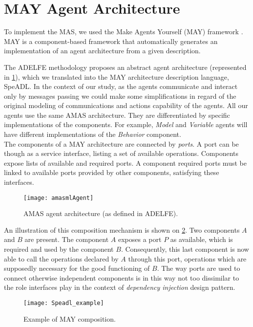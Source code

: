 \section{MAY Agent Architecture}

To implement the MAS, we used the Make Agents Yourself (MAY) framework \cite{No2012.2}. MAY is a component-based framework that automatically generates an implementation of an agent architecture from a given description.

The ADELFE methodology proposes an abstract agent architecture (represented in \figurename{} \ref{AMAS-ML_agent}), which we translated into the MAY architecture description language, SpeADL. In the context of our study, as the agents communicate and interact only by messages passing we could make some simplifications in regard of the original modeling of communications and actions capability of the agents. All our agents use the same AMAS architecture. They are differentiated by specific implementations of the components. For example, \emph{Model} and \emph{Variable} agents will have different implementations of the \emph{Behavior} component.\\
The components of a MAY architecture are connected by \emph{ports}. A port can be though as a service interface, listing a set of available operations. Components expose lists of available and required ports. A component required ports must be linked to available ports provided by other components, satisfying these interfaces.

\begin{figure}
\centering
\texttt{[image: amasmlAgent]}
\caption{AMAS agent architecture (as defined in ADELFE).}\label{AMAS-ML_agent}
\end{figure}

An illustration of this composition mechanism is shown on \figurename{} \ref{Speadl_example}. Two components $A$ and $B$ are present. The component $A$ exposes a port $P$ as available, which is required and used by the component $B$. Consequently, this last component is now able to call the operations declared by $A$ through this port, operations which are supposedly necessary for the good functioning of $B$. The way ports are used to connect otherwise independent components is in this way not too dissimilar to the role interfaces play in the context of \emph{dependency injection} design pattern.

\begin{figure}
\centering
\texttt{[image: Speadl\_example]}
\caption{Example of MAY composition.}\label{Speadl_example}
\end{figure}

